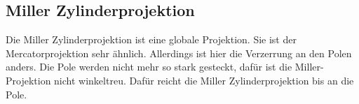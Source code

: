 \subsection{Miller Zylinderprojektion}
\label{sec:miller}
Die Miller Zylinderprojektion ist eine globale Projektion. Sie ist der Mercatorprojektion sehr ähnlich.
Allerdings ist hier die Verzerrung an den Polen anders. Die Pole werden nicht mehr so stark gesteckt, dafür ist die Miller-Projektion nicht winkeltreu. Dafür reicht die Miller Zylinderprojektion bis an die Pole. 
